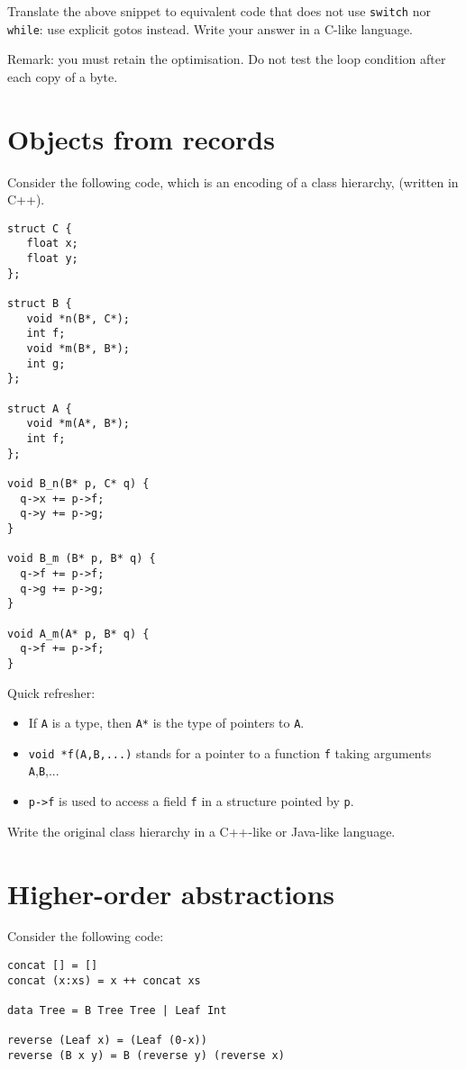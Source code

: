 \documentclass{article}
\begin{document}
Translate the above snippet to equivalent code that does not use
\texttt{switch} nor \texttt{while}: use explicit gotos instead.
Write your answer in a C-like language.

Remark: you must retain the optimisation. Do not test the loop
condition after each copy of a byte.

\newpage
\section{Objects from records}

Consider the following code, which is an encoding of a class
hierarchy, (written in C++).
\begin{verbatim}
struct C {
   float x;
   float y;
};

struct B {
   void *n(B*, C*);
   int f;
   void *m(B*, B*);
   int g;
};

struct A {
   void *m(A*, B*);
   int f;
};

void B_n(B* p, C* q) {
  q->x += p->f;
  q->y += p->g;
}

void B_m (B* p, B* q) {
  q->f += p->f;
  q->g += p->g;
}

void A_m(A* p, B* q) {
  q->f += p->f;
}
\end{verbatim}

Quick refresher:
\begin{itemize}
\item If \texttt{A} is a type, then \texttt{A*} is the type of
  pointers to \texttt{A}.
\item \texttt{void *f(A,B,...)} stands for a pointer to a function
  \texttt{f} taking arguments \texttt{A},\texttt{B},...
\item \texttt{p->f} is used to access a field \texttt{f} in a
  structure pointed by \texttt{p}.
\end{itemize}

Write the original class hierarchy in a C++-like or Java-like language.


\newpage
\section{Higher-order abstractions}

Consider the following code:
\begin{verbatim}
concat [] = []
concat (x:xs) = x ++ concat xs

data Tree = B Tree Tree | Leaf Int

reverse (Leaf x) = (Leaf (0-x))
reverse (B x y) = B (reverse y) (reverse x)
\end{verbatim}
\end{document}
